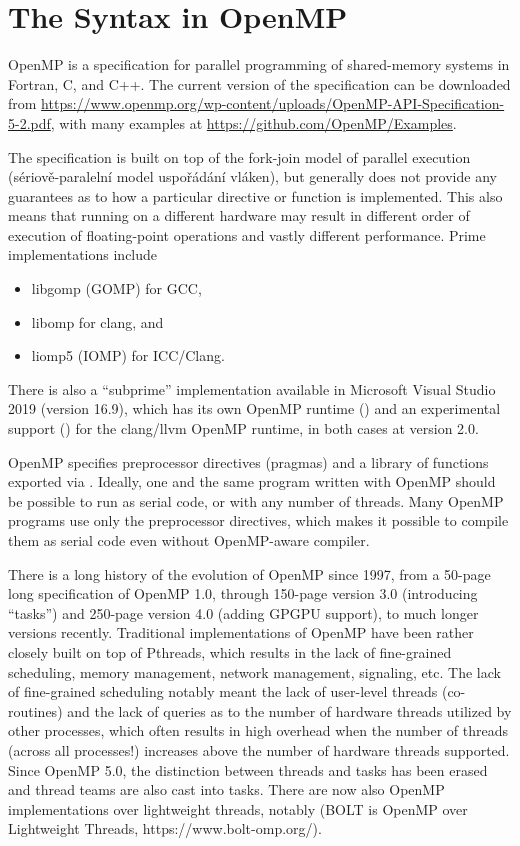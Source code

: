 \chapter{The Syntax in OpenMP}

OpenMP is a specification for parallel programming of shared-memory systems in Fortran, C, and C++. 
The current version of the specification can be downloaded from \url{https://www.openmp.org/wp-content/uploads/OpenMP-API-Specification-5-2.pdf}, with many examples at \url{https://github.com/OpenMP/Examples}.

The specification is built on top of the fork-join model of parallel execution (sériově-paralelní model uspořádání vláken),
but generally does not provide any guarantees as to how a particular directive or function is implemented. 
This also means that running on a different hardware may result in different order of execution of floating-point operations and vastly different performance.  
Prime implementations include 
\begin{itemize}
\item libgomp (GOMP) for GCC, 
\item libomp for clang, and 
\item liomp5 (IOMP) for ICC/Clang.
\end{itemize} 
There is also a ``subprime'' implementation available in Microsoft Visual Studio 2019 (version 16.9), which has its own OpenMP runtime () and an experimental support () for the clang/llvm OpenMP runtime, in both cases at version 2.0. 

OpenMP specifies preprocessor directives (pragmas) and a library of functions exported via .
Ideally, one and the same program written with OpenMP should be possible to run as serial code, or with any number of threads. 
Many OpenMP programs use only the preprocessor directives, which makes it possible to compile them as serial code even without OpenMP-aware compiler. 

There is a long history of the evolution of OpenMP since 1997, from a 50-page long specification of OpenMP 1.0, through 150-page version 3.0 (introducing ``tasks'') and 250-page version 4.0 (adding GPGPU support), to much longer versions recently. 
Traditional implementations of OpenMP have been rather closely built on top of Pthreads, 
which results in the lack of fine-grained scheduling, 
memory management, network management, signaling, etc.
The lack of fine-grained scheduling notably meant the lack of user-level threads (co-routines)
and the lack of queries as to the number of hardware threads utilized by other processes, 
which often results in high overhead when the number of threads (across all processes!) increases above the number of hardware threads supported.
Since OpenMP 5.0, the distinction between threads and tasks has been erased and thread teams are also cast into tasks. There are now also OpenMP implementations over lightweight threads, notably (BOLT is OpenMP over Lightweight Threads, https://www.bolt-omp.org/). 

